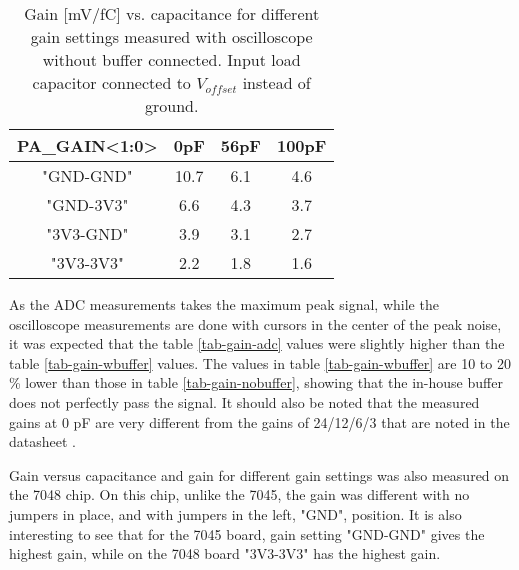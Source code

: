 \documentclass[../main/thesis.tex]{subfiles}
\begin{document}
\begin{table}[h!]
	\begin{center}
		\caption{Gain [mV/fC] vs. capacitance for different gain settings measured with oscilloscope without buffer connected. Input load capacitor connected to $V_{offset}$ instead of ground.}
		\label{tab-gain-nobuffer-offset}
		\begin{tabular}{cccc}\toprule
			\textbf{PA\_GAIN<1:0>} & \textbf{0pF}  & \textbf{56pF} & \textbf{100pF} \\ \midrule
			"GND-GND"     & 10.7 & 6.1  & 4.6  \\
			"GND-3V3"     & 6.6  & 4.3  & 3.7   \\
			"3V3-GND"     & 3.9 & 3.1 & 2.7   \\
			"3V3-3V3"     & 2.2 & 1.8 & 1.6   \\ \bottomrule
		\end{tabular}
	\end{center}
\end{table}

As the ADC measurements takes the maximum peak signal, while the oscilloscope measurements are done with cursors in the center of the peak noise, it was expected that the table \ref{tab-gain-adc} values were slightly higher than the table \ref{tab-gain-wbuffer} values. The values in table \ref{tab-gain-wbuffer} are 10 to 20 \% lower than those in table \ref{tab-gain-nobuffer}, showing that the in-house buffer does not perfectly pass the signal. It should also be noted that the measured gains at 0 pF are very different from the gains of 24/12/6/3 that are noted in the datasheet \citep{IDE1180}.

Gain versus capacitance and gain for different gain settings was also measured on the 7048 chip. On this chip, unlike the 7045, the gain was different with no jumpers in place, and with jumpers in the left, "GND", position. It is also interesting to see that for the 7045 board, gain setting "GND-GND" gives the highest gain, while on the 7048 board "3V3-3V3" has the highest gain. 
\end{document}
